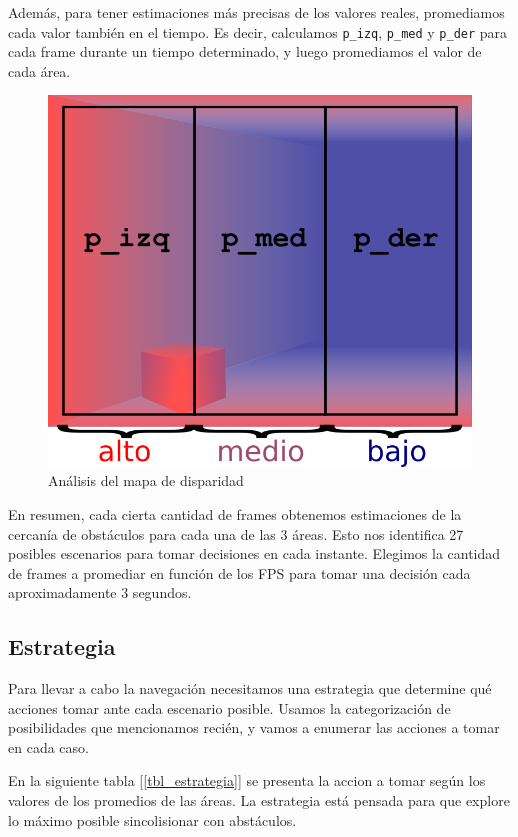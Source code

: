 \documentclass[journal,a4paper]{IEEEtran}
\begin{document}
Además, para tener estimaciones más precisas de los valores reales, promediamos cada valor también en el tiempo. Es decir, calculamos \texttt{p\_izq}, \texttt{p\_med} y \texttt{p\_der} para cada frame durante un tiempo determinado, y luego promediamos el valor de cada área.

\begin{figure}[h!]
    \centering
    \includegraphics[width=0.9\linewidth]{disparidad.png}
    \caption{Análisis del mapa de disparidad}
    \label{fig_disparidad}
\end{figure}

En resumen, cada cierta cantidad de frames obtenemos estimaciones de la cercanía de obstáculos para cada una de las 3 áreas. Esto nos identifica 27 posibles escenarios para tomar decisiones en cada instante. Elegimos la cantidad de frames a promediar en función de los FPS para tomar una decisión cada aproximadamente 3 segundos.

\subsection{Estrategia}
Para llevar a cabo la navegación necesitamos una estrategia que determine qué acciones tomar ante cada escenario posible.
Usamos la categorización de posibilidades que mencionamos recién, y vamos a enumerar las acciones a tomar en cada caso.

En la siguiente tabla [\ref{tbl_estrategia}] se presenta la accion a tomar según los valores de los promedios de las áreas.
La estrategia está pensada para que explore lo máximo posible sincolisionar con abstáculos.
\end{document}
